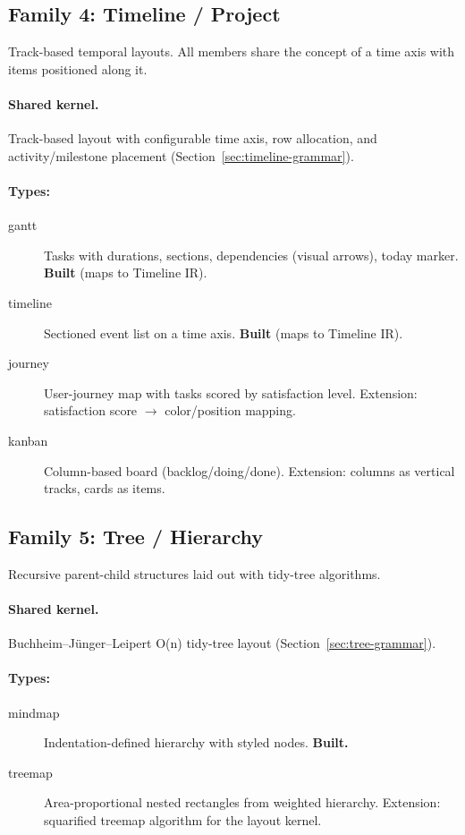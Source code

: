 \subsection{Family 4: Timeline / Project}
\label{sec:family-timeline}

Track-based temporal layouts. All members share the concept of a time axis with items
positioned along it.

\paragraph{Shared kernel.} Track-based layout with configurable time axis, row allocation,
and activity/milestone placement (Section~\ref{sec:timeline-grammar}).

\paragraph{Types:}
\begin{description}
  \item[gantt] Tasks with durations, sections, dependencies (visual arrows), today marker.
        \textbf{Built} (maps to Timeline IR).
  \item[timeline] Sectioned event list on a time axis. \textbf{Built} (maps to Timeline IR).
  \item[journey] User-journey map with tasks scored by satisfaction level.
        Extension: satisfaction score $\to$ color/position mapping.
  \item[kanban] Column-based board (backlog/doing/done). Extension: columns as
        vertical tracks, cards as items.
\end{description}

\subsection{Family 5: Tree / Hierarchy}
\label{sec:family-tree}

Recursive parent-child structures laid out with tidy-tree algorithms.

\paragraph{Shared kernel.} Buchheim--J\"unger--Leipert O(n) tidy-tree layout
(Section~\ref{sec:tree-grammar}).

\paragraph{Types:}
\begin{description}
  \item[mindmap] Indentation-defined hierarchy with styled nodes. \textbf{Built.}
  \item[treemap] Area-proportional nested rectangles from weighted hierarchy.
        Extension: squarified treemap algorithm for the layout kernel.
\end{description}

